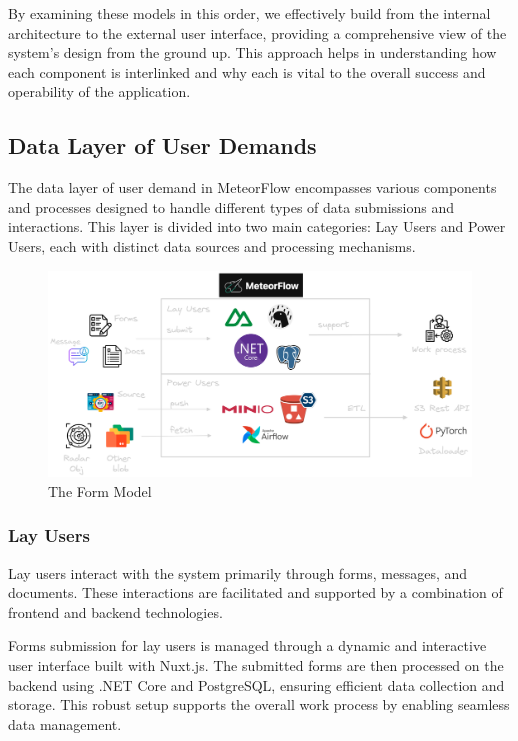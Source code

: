 By examining these models in this order, we effectively build from the internal
architecture to the external user interface, providing a comprehensive view of
the system's design from the ground up. This approach helps in understanding how
each component is interlinked and why each is vital to the overall success and
operability of the application.

\subsection{Data Layer of User Demands}

The data layer of user demand in MeteorFlow encompasses various components and
processes designed to handle different types of data submissions and
interactions. This layer is divided into two main categories: Lay Users and
Power Users, each with distinct data sources and processing mechanisms.

\begin{figure}[H]
  \centering
  \includegraphics[width=\linewidth]{Images/userDemand.png}
  \vspace{1em}
  \caption{The Form Model}
\end{figure}

\subsubsection*{Lay Users}

Lay users interact with the system primarily through forms, messages, and
documents. These interactions are facilitated and supported by a combination of
frontend and backend technologies.

Forms submission for lay users is managed through a dynamic and interactive user
interface built with Nuxt.js. The submitted forms are then processed on the
backend using .NET Core and PostgreSQL, ensuring efficient data collection and
storage. This robust setup supports the overall work process by enabling
seamless data management.

